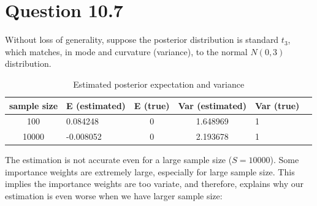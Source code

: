 \documentclass{article}
\begin{document}
\section*{Question 10.7}
{
    Without loss of generality, suppose the posterior distribution is standard $t_3$, which matches, in mode and curvature (variance), to the normal $N(0, 3)$ distribution. 
    \begin{table}[H]
        \centering
        \caption{Estimated posterior expectation and variance}
        \begin{tabular}{@{}clc@{}clc@{}}
        \toprule
        sample size & \multicolumn{1}{c}{E (estimated)} & \multicolumn{1}{c}{E (true)} & \multicolumn{1}{c}{Var (estimated)} & \multicolumn{1}{c}{Var (true)}  \\ \midrule
        100 & 0.084248 & 0 & 1.648969 & 1   \\ 
        10000 & -0.008052 & 0 & 2.193678 & 1  \\ \bottomrule
        \end{tabular}
    \end{table}
    The estimation is not accurate even for a large sample size ($S=10000$).
    Some importance weights are extremely large, especially for large sample size. This implies the importance weights are too variate, and therefore, explains why our estimation is even worse when we have larger sample size: 
    
}
\end{document}

